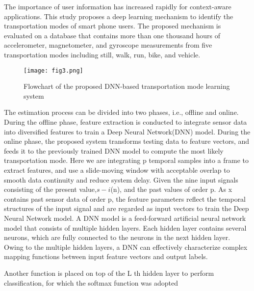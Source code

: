 \documentclass[10pt,a4paper,journal]{IEEEtran}
\begin{document}
\hspace{2em} The importance of user information
has increased rapidly for context-aware applications. This study
proposes a deep learning mechanism to identify the transportation modes of smart phone users. The proposed mechanism is
evaluated on a database that contains more than one thousand
hours of accelerometer, magnetometer, and gyroscope measurements from five transportation modes including still, walk, run,
bike, and vehicle.

\begin{figure}[htbp]
\begin{center}
\hbox{\texttt{[image: fig3.png]}}
\caption{Flowchart of the proposed DNN-based transportation mode learning
system\cite{2}}
\label{4}
\end{center}
\end{figure} 

\hspace{2em}The estimation process can be divided into two phases, i.e.,
offline and online. During the offline phase, feature extraction
is conducted to integrate sensor data into diversified features
to train a Deep Neural Network(DNN) model. During the online phase, the proposed
system transforms testing data to feature vectors, and feeds
it to the previously trained DNN model to compute the most
likely transportation mode. Here we are integrating p temporal samples into a frame
to extract features, and use a slide-moving window with acceptable overlap to smooth data continuity and reduce system
delay. Given the nine input signals consisting of the present
value,$s-i$(n), and the past values of order p. As x contains past sensor data of order
p, the feature parameters reflect the temporal structures of the
input signal and are regarded as input vectors to train the Deep Neural Network model. A DNN model is a feed-forward artificial neural network
model that consists of multiple hidden layers. Each hidden
layer contains several neurons, which are fully connected to
the neurons in the next hidden layer. Owing to the multiple
hidden layers, a DNN can effectively characterize complex
mapping functions between input feature vectors and output
labels.

\hspace{2em} Another function is placed on top of the L th hidden
layer to perform classification, for which the softmax function
was adopted 
\end{document}
